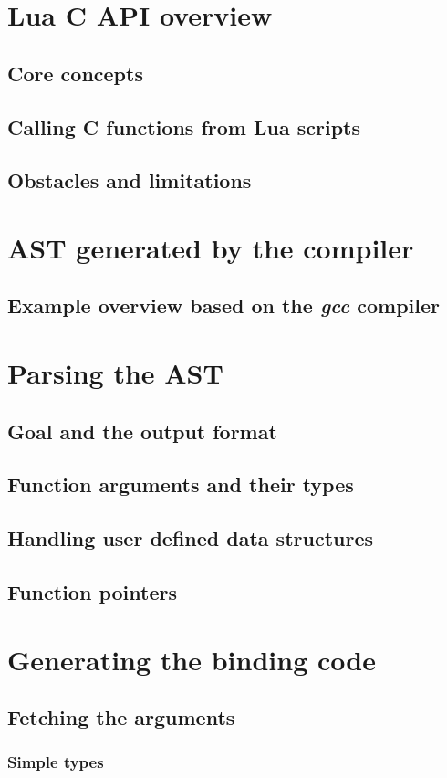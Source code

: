 \documentclass[polish, english]{iithesis}
\begin{document}
\chapter{Lua C API overview}
  \section{Core concepts}
  \section{Calling C functions from Lua scripts}
  \section{Obstacles and limitations}
\chapter{AST generated by the compiler}
  \section{Example overview based on the \textit{gcc} compiler}
\chapter{Parsing the AST}
  \section{Goal and the output format}
  \section{Function arguments and their types}
  \section{Handling user defined data structures}
  \section{Function pointers}
\chapter{Generating the binding code}
  \section{Fetching the arguments}
    \subsection{Simple types}
\end{document}
